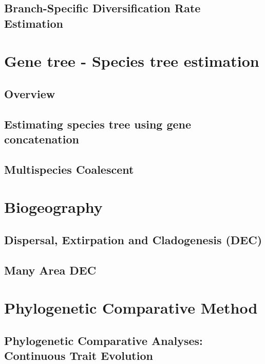 \documentclass[11pt]{book}
\begin{document}
\chapter{Branch-Specific Diversification Rate Estimation}
\def \ResourcePath {RB_DiversificationRate_BranchSpecific_Tutorial/}






\part{Gene tree - Species tree estimation}

\chapter{Overview}
\def \ResourcePath {RB_GTST_Tutorial/}


\chapter{Estimating species tree using gene concatenation}
\def \ResourcePath {RB_GeneConcatenation_Tutorial/}


\chapter{Multispecies Coalescent}
\def \ResourcePath {RB_MultispeciesCoalescent_Tutorial/}







\part{Biogeography}

\chapter{Dispersal, Extirpation and Cladogenesis (DEC)}
\def \ResourcePath {RB_Biogeography_DEC_Tutorial/}


\chapter{Many Area DEC}
\def \ResourcePath {RB_Biogeography_many_area_Tutorial/}








\part{Phylogenetic Comparative Method}
\chapter{Phylogenetic Comparative Analyses: Continuous Trait Evolution}
\def \ResourcePath {RB_PhyloComparative_Tutorial/}

\end{document}
